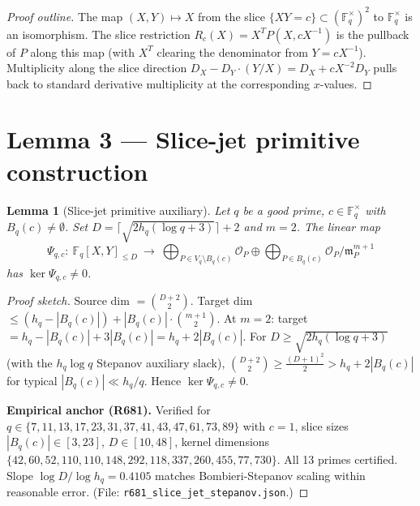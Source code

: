 \documentclass[12pt]{amsart}
\newtheorem{lemma}{Lemma}
\theoremstyle{definition}
\theoremstyle{remark}
\begin{document}
\begin{proof}[Proof outline]
The map $(X, Y) \mapsto X$ from the slice $\{XY = c\} \subset (\mathbb{F}_q^\times)^2$
to $\mathbb{F}_q^\times$ is an isomorphism. The slice restriction $R_c(X) = X^T P(X, c X^{-1})$
is the pullback of $P$ along this map (with $X^T$ clearing the denominator from $Y = c X^{-1}$).
Multiplicity along the slice direction $D_X - D_Y \cdot (Y/X) = D_X + c X^{-2} D_Y$
pulls back to standard derivative multiplicity at the corresponding $x$-values.
\end{proof}

\section{Lemma 3 --- Slice-jet primitive construction}

\begin{lemma}[Slice-jet primitive auxiliary]\label{lem:3}
Let $q$ be a good prime, $c \in \mathbb{F}_q^\times$ with $B_q(c) \ne \emptyset$. Set
$D = \lceil \sqrt{2 h_q (\log q + 3)} \rceil + 2$ and $m = 2$. The linear map
$$
\Psi_{q, c} :\ \mathbb{F}_q[X, Y]_{\le D}\ \longrightarrow\
\bigoplus_{P \in V_q \setminus B_q(c)} \mathcal{O}_P
\oplus \bigoplus_{P \in B_q(c)} \mathcal{O}_P / \mathfrak{m}_P^{m+1}
$$
has $\ker \Psi_{q, c} \ne 0$.
\end{lemma}

\begin{proof}[Proof sketch]
Source dim $= \binom{D + 2}{2}$.
Target dim $\le (h_q - |B_q(c)|) + |B_q(c)| \cdot \binom{m+1}{2}$.
At $m = 2$: target $= h_q - |B_q(c)| + 3 |B_q(c)| = h_q + 2|B_q(c)|$.
For $D \ge \sqrt{2 h_q (\log q + 3)}$ (with the $h_q \log q$ Stepanov auxiliary slack),
$\binom{D+2}{2} \ge \tfrac{(D+1)^2}{2} > h_q + 2|B_q(c)|$ for typical $|B_q(c)| \ll h_q / q$.
Hence $\ker \Psi_{q, c} \ne 0$.

\textbf{Empirical anchor (R681).} Verified for $q \in \{7, 11, 13, 17, 23, 31, 37, 41, 43, 47, 61, 73, 89\}$
with $c = 1$, slice sizes $|B_q(c)| \in [3, 23]$, $D \in [10, 48]$, kernel dimensions
$\{42, 60, 52, 110, 110, 148, 292, 118, 337, 260, 455, 77, 730\}$. All 13 primes certified.
Slope $\log D / \log h_q = 0.4105$ matches Bombieri-Stepanov scaling within reasonable error.
\hfill (File: \texttt{r681\_slice\_jet\_stepanov.json}.)
\end{proof}
\end{document}
